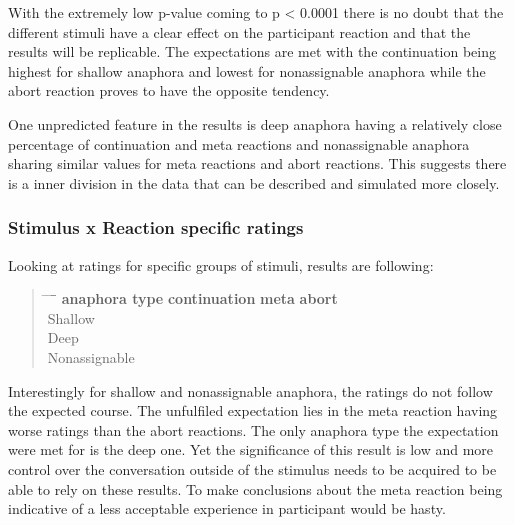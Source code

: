 With the extremely low p-value coming to p < 0.0001
 there is no doubt
that the different stimuli have a clear effect on the participant reaction and
that the results will be replicable.
The expectations are met with the continuation being highest for shallow anaphora
and lowest for nonassignable anaphora while
the abort reaction proves to have the opposite tendency.

One unpredicted feature in the results is
deep anaphora having a relatively close percentage of continuation and meta reactions and
nonassignable anaphora sharing similar values for meta reactions and abort reactions.
This suggests there is a inner division in the data that can be described and simulated more closely.

\subsubsection{Stimulus x Reaction specific ratings}

Looking at ratings for specific groups of stimuli, results are following:

\begin{quote}
\begin{tabbing}
\hspace{4cm} \= \hspace{3cm} \= \hspace{3cm} \= \= \hspace{3cm} \kill %
\textbf{anaphora type} \> \textbf{continuation} \> \textbf{meta} \> \textbf{abort} \\
Shallow    \\
Deep    \\
Nonassignable    \\
\end{tabbing}
\end{quote}

Interestingly for shallow and nonassignable anaphora,
the ratings do not follow the expected course.
The unfulfiled expectation lies in the meta reaction having worse ratings than the abort reactions.
The only anaphora type the expectation were met for is the deep one.
Yet the significance of this result is low and
more control over the conversation outside of the stimulus needs to be acquired
to be able to rely on these results.
To make conclusions about the meta reaction being indicative of
a less acceptable experience in participant
would be hasty.

